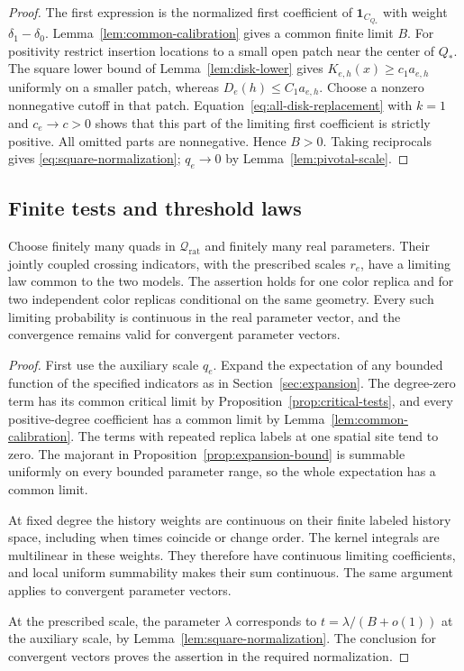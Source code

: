 \begin{proof}
The first expression is the normalized first coefficient of
$\mathbf1_{C_{Q_*}}$ with weight $\delta_1-\delta_0$.
Lemma~\ref{lem:common-calibration} gives a common finite limit $B$.
For positivity restrict insertion locations to a small open patch
near the center of $Q_*$. The square lower bound of
Lemma~\ref{lem:disk-lower} gives
$K_{e,h}(x)\ge c_1 a_{e,h}$ uniformly on a smaller patch, whereas
$D_e(h)\le C_1a_{e,h}$. Choose a nonzero nonnegative cutoff in that
patch. Equation~\eqref{eq:all-disk-replacement} with $k=1$ and $c_e\to c>0$
shows that this part of the limiting first coefficient is strictly
positive. All omitted parts are nonnegative. Hence $B>0$.
Taking reciprocals gives \eqref{eq:square-normalization};
$q_e\to0$ by Lemma~\ref{lem:pivotal-scale}.
\end{proof}

\subsection{Finite tests and threshold laws}

\begin{proposition}
\label{prop:nearcritical-tests}
Choose finitely many quads in $\mathcal Q_{\mathrm{rat}}$ and finitely
many real parameters. Their jointly coupled crossing indicators,
with the prescribed scales $r_e$, have a limiting law common to the
two models. The assertion holds for one color replica and for two
independent color replicas conditional on the same geometry.
Every such limiting probability is continuous in the real parameter
vector, and the convergence remains valid for convergent parameter
vectors.
\end{proposition}

\begin{proof}
First use the auxiliary scale $q_e$. Expand the expectation of any
bounded function of the specified indicators as in
Section~\ref{sec:expansion}. The degree-zero term has its common critical limit by
Proposition~\ref{prop:critical-tests}, and every positive-degree
coefficient has a common limit by Lemma~\ref{lem:common-calibration}. The terms with repeated
replica labels at one spatial site tend to zero. The majorant in
Proposition~\ref{prop:expansion-bound} is summable uniformly on every
bounded parameter range, so the whole expectation has a common limit.

At fixed degree the history weights are continuous on their finite
labeled history space, including when times coincide or change order.
The kernel integrals are multilinear in these weights. They therefore
have continuous limiting coefficients, and local uniform summability
makes their sum continuous. The same argument applies to convergent
parameter vectors.

At the prescribed scale, the parameter $\lambda$ corresponds to
$t=\lambda/(B+o(1))$ at the auxiliary scale, by
Lemma~\ref{lem:square-normalization}. The conclusion for convergent
vectors proves the assertion in the required normalization.
\end{proof}

